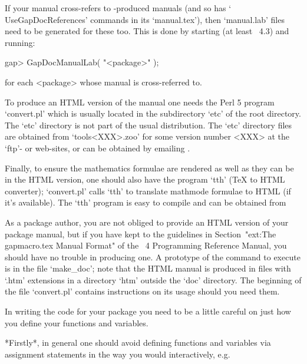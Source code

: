 If your manual cross-refers to -produced manuals (and  so
has  `\\UseGapDocReferences'  commands   in   its   `manual.tex'),   then
`manual.lab' files need to be generated for these too. This  is  done  by
starting {\GAP} (at least {\GAP}~4.3) and running:

gap> GapDocManualLab( "<package>" );

for each <package> whose manual is cross-referred to.

To produce an HTML version of the manual one needs  the  Perl  5  program
`convert.pl' which is usually located in the subdirectory  `etc'  of  the
{\GAP} root directory. The `etc' directory  is  not  part  of  the  usual
{\GAP}  distribution.  The  `etc'  directory  files  are  obtained   from
`tools<XXX>.zoo' for some version number <XXX> at the  {\GAP}  `ftp'-  or
web-sites,      or      can      be      obtained       by       emailing
.

Finally, to ensure the mathematics formulae are rendered as well as  they
can be in the HTML version,  one  should  also  have  the  program  `tth'
({\TeX}  to  HTML  converter);  `convert.pl'  calls  `tth'  to  translate
mathmode formulae to HTML (if it's available). The `tth' program is  easy
to compile and can be obtained from

As a package author, you are not obliged to provide an  HTML  version  of
your  package  manual,  but  if  you  have  kept  to  the  guidelines  in
Section~"ext:The gapmacro.tex Manual Format" of the {\GAP}~4  Programming
Reference Manual,  you  should  have  no  trouble  in  producing  one.  A
prototype of the command to execute is in the file `make_doc'; note  that
the HTML manual  is  produced  in  files  with  `.htm'  extensions  in  a
directory `htm' outside the `doc' directory. The beginning  of  the  file
`convert.pl' contains instructions on its usage should you need them.


In writing the {\GAP} code for your package  you  need  to  be  a  little
careful on just how you define your functions and variables.

*Firstly*, in general one should avoid defining functions  and  variables
via assignment statements in the way you would interactively, e.g.

